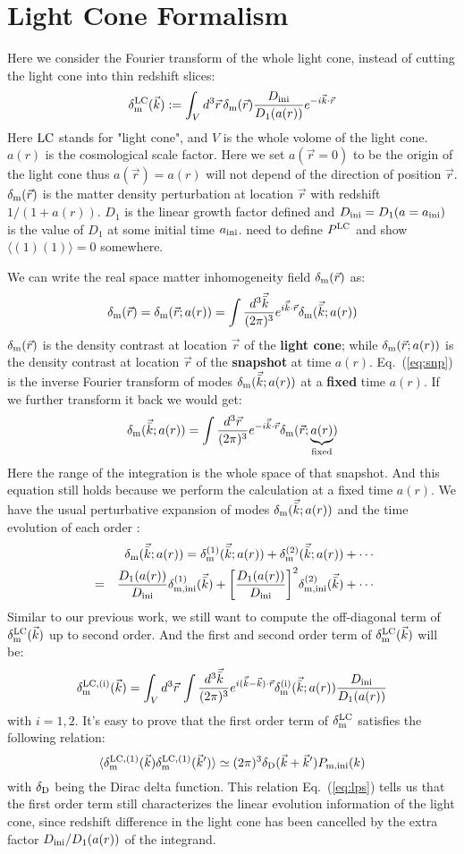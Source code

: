 \documentclass[prd,amsmath,amssymb,floatfix,superscriptaddress,nofootinbib,twocolumn]{revtex4-1}
\def\be{\begin{equation}}
\def\ee{\end{equation}}
\def\bea{\begin{eqnarray}}
\def\eea{\end{eqnarray}}
\newcommand{\LC}{\rm LC}
\newcommand{\ini}{\rm ini}
\newcommand{\vbk}{\vec{\bar{k}}}
\newcommand{\vrr}{\vec{r}}
\newcommand{\vs}{\nonumber\\}
\newcommand{\vk}{\vec{k}}
\newcommand{\ec}[1]{Eq.~(\ref{eq:#1})}
\newcommand{\eql}[1]{\label{eq:#1}}
\newcommand{\peikai}[1]{{\color{blue} #1}}
\begin{document}
\section{Light Cone Formalism}
Here we consider the Fourier transform of the whole light cone, instead of cutting the light cone into thin redshift slices:
\be
\delta^{\LC}_{\rm m}(\vk) :=\int_{V} d^3\vrr  \, \delta_{\rm m}(\vrr) \frac{D_{\ini}}{D_{1}(a(r))}  e^{-i\vk \cdot\vrr} \eql{LC}
\ee
Here $\LC$ stands for "light cone", and $V$ is the whole volome of the light cone. $a(r)$ is the cosmological scale factor. Here we set $a(\vrr=0)$ to be the origin of the light cone thus $a(\vrr)=a(r)$ will not depend of the direction of position $\vrr$. $\delta_{\rm m}(\vrr)$ is the matter density perturbation at location $\vrr$ with redshift $1/(1+a(r))$. $D_1$ is the linear growth factor defined and $D_{\ini} = D_1(a=a_{\ini})$ is the value of $D_1$ at some initial time $a_{\rm ini}$. \peikai{need to define $P^{\rm LC}$ and show $\langle (1)(1) \rangle =0$ somewhere.}
 
We can write the real space matter inhomogeneity field $\delta_{\rm m}(\vrr)$ as:
\be 
\delta_{\rm m}(\vrr)=\delta_{\rm m}(\vrr;a(r))=\int \frac{d^3 \vbk}{(2\pi)^3}e^{i\vbk\cdot\vrr}\delta_{\rm m}(\vbk;a(r))\eql{snp}
\ee 
$\delta_{\rm m}(\vrr)$ is the density contrast at location $\vrr$ of the \textbf{light cone}; while $\delta_{\rm m}(\vrr;a(r))$ is the density contrast at location $\vrr$ of the \textbf{snapshot} at time $a(r)$. \ec{snp} is the inverse Fourier transform of modes $\delta_{\rm m}(\vbk;a(r))$ at a \textbf{fixed} time $a(r)$. If we further transform it back we would get:
\be 
\delta_{\rm m}(\vbk;a(r))=\int \frac{d^3 \vrr}{(2\pi)^3}e^{-i\vbk\cdot\vrr}\delta_{\rm m}(\vrr;\underbrace{a(r)}_{\rm fixed})
\ee 
Here the range of the integration is the whole space of that snapshot. And this equation still holds because we perform the calculation at a fixed time $a(r)$. We have the usual perturbative expansion of modes $\delta_{\rm m}(\vbk;a(r))$ and the time evolution of each order \cite{Bernardeau:2002rev}:
\bea
&&\delta_{\rm m}(\vbk;a(r))=\delta^{(1)}_{\rm m}(\vbk;a(r))+\delta^{(2)}_{\rm m}(\vbk;a(r))+\cdots\vs
&=&\frac{D_1(a(r))}{D_{\rm ini}}\delta^{(1)}_{\rm m,ini}(\vbk)+\bigg[\frac{D_1(a(r))}{D_{\rm ini}}\bigg]^2\delta^{(2)}_{\rm m,ini}(\vbk)+\cdots
\eea 
Similar to our previous work, we still want to compute the off-diagonal term of $\delta^{\LC}_{\rm m}(\vk)$ up to second order. And the first and second order term of $\delta^{\LC}_{\rm m}(\vk)$ will be:
\be 
\delta^{\LC,(\rm i)}_{\rm m}(\vk)=\int_{V} d^3\vrr  \, \int \frac{d^3 \vbk}{(2\pi)^3}e^{i(\vbk-\vk)\cdot\vrr}\delta^{(\rm i)}_{\rm m}(\vbk;a(r))\frac{D_{\ini}}{D_{1}(a(r))}  \eql{exp}
\ee 
with $i=1,2$. It's easy to prove that the first order term of $\delta^{\LC}_{\rm m}$ satisfies the following relation:
\be 
\langle \delta^{\LC,(\rm 1)}_{\rm m}(\vk) \delta^{\LC,(\rm 1)}_{\rm m}(\vk') \rangle \simeq (2\pi)^3 \delta_{\rm D}(\vk+\vk')P_{\rm m,ini}(k)\eql{lps}
\ee 
with $\delta_{\rm D}$ being the Dirac delta function. This relation \ec{lps} tells us that the first order term still characterizes the linear evolution information of the light cone, since redshift difference in the light cone has been cancelled by the extra factor $D_{\ini}/D_{1}(a(r))$ of the integrand.
\end{document}
